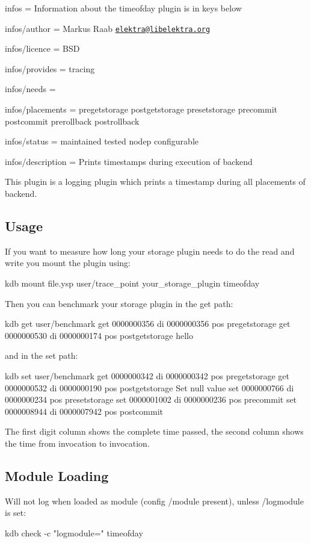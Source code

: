 
\begin{DoxyItemize}
\item infos = Information about the timeofday plugin is in keys below
\item infos/author = Markus Raab \href{mailto:elektra@libelektra.org}{\tt elektra@libelektra.\+org}
\item infos/licence = B\+S\+D
\item infos/provides = tracing
\item infos/needs =
\item infos/placements = pregetstorage postgetstorage presetstorage precommit postcommit prerollback postrollback
\item infos/status = maintained tested nodep configurable
\item infos/description = Prints timestamps during execution of backend
\end{DoxyItemize}

This plugin is a logging plugin which prints a timestamp during all placements of backend.

\subsection*{Usage}

If you want to measure how long your storage plugin needs to do the read and write you mount the plugin using\+: \begin{DoxyVerb}kdb mount file.ysp user/trace_point your_storage_plugin timeofday
\end{DoxyVerb}


Then you can benchmark your storage plugin in the get path\+: \begin{DoxyVerb}kdb get user/benchmark
get     0000000356      di      0000000356      pos     pregetstorage
get     0000000530      di      0000000174      pos     postgetstorage
hello
\end{DoxyVerb}


and in the set path\+: \begin{DoxyVerb}kdb set user/benchmark
get     0000000342      di      0000000342      pos     pregetstorage
get     0000000532      di      0000000190      pos     postgetstorage
Set null value
set     0000000766      di      0000000234      pos     presetstorage
set     0000001002      di      0000000236      pos     precommit
set     0000008944      di      0000007942      pos     postcommit
\end{DoxyVerb}


The first digit column shows the complete time passed, the second column shows the time from invocation to invocation.

\subsection*{Module Loading}

Will not log when loaded as module (config {\ttfamily /module} present), unless {\ttfamily /logmodule} is set\+: \begin{DoxyVerb}kdb check -c "logmodule=" timeofday\end{DoxyVerb}
 